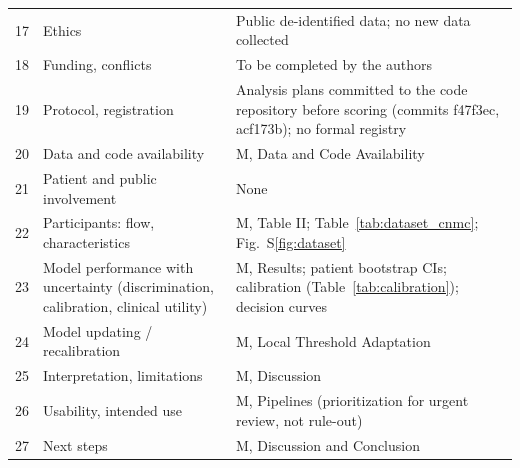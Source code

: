 \begin{table}[!htbp]
\begin{tabular}{p{0.6cm}p{6.6cm}p{8.6cm}}
17 & Ethics & Public de-identified data; no new data collected \\
18 & Funding, conflicts & To be completed by the authors \\
19 & Protocol, registration & Analysis plans committed to the code repository before scoring (commits f47f3ec, acf173b); no formal registry \\
20 & Data and code availability & M, Data and Code Availability \\
21 & Patient and public involvement & None \\
22 & Participants: flow, characteristics & M, Table II; Table~\ref{tab:dataset_cnmc}; Fig.~S\ref{fig:dataset} \\
23 & Model performance with uncertainty (discrimination, calibration, clinical utility) & M, Results; patient bootstrap CIs; calibration (Table~\ref{tab:calibration}); decision curves \\
24 & Model updating / recalibration & M, Local Threshold Adaptation \\
25 & Interpretation, limitations & M, Discussion \\
26 & Usability, intended use & M, Pipelines (prioritization for urgent review, not rule-out) \\
27 & Next steps & M, Discussion and Conclusion \\
\bottomrule
\end{tabular}
\end{table}
